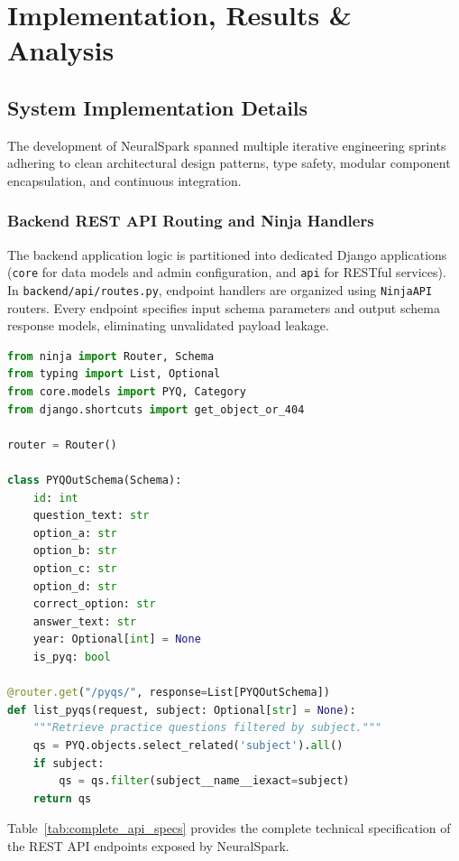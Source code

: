 \chapter{Implementation, Results \& Analysis}

\section{System Implementation Details}
The development of NeuralSpark spanned multiple iterative engineering sprints adhering to clean architectural design patterns, type safety, modular component encapsulation, and continuous integration.

\subsection{Backend REST API Routing and Ninja Handlers}
The backend application logic is partitioned into dedicated Django applications (\texttt{core} for data models and admin configuration, and \texttt{api} for RESTful services). In \texttt{backend/api/routes.py}, endpoint handlers are organized using \texttt{NinjaAPI} routers. Every endpoint specifies input schema parameters and output schema response models, eliminating unvalidated payload leakage.

\begin{lstlisting}[language=Python, caption={Django Ninja Asynchronous API Route Implementation}]
from ninja import Router, Schema
from typing import List, Optional
from core.models import PYQ, Category
from django.shortcuts import get_object_or_404

router = Router()

class PYQOutSchema(Schema):
    id: int
    question_text: str
    option_a: str
    option_b: str
    option_c: str
    option_d: str
    correct_option: str
    answer_text: str
    year: Optional[int] = None
    is_pyq: bool

@router.get("/pyqs/", response=List[PYQOutSchema])
def list_pyqs(request, subject: Optional[str] = None):
    """Retrieve practice questions filtered by subject."""
    qs = PYQ.objects.select_related('subject').all()
    if subject:
        qs = qs.filter(subject__name__iexact=subject)
    return qs
\end{lstlisting}

Table~\ref{tab:complete_api_specs} provides the complete technical specification of the REST API endpoints exposed by NeuralSpark.

